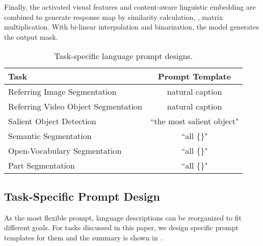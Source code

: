 \documentclass[10pt,twocolumn,letterpaper]{article}
\begin{document}
Finally, the activated visual features and content-aware linguistic embedding are combined to generate response map by similarity calculation, \ie, matrix multiplication. With bi-linear interpolation and binarization, the model generates the output mask.










\begin{table}
    \centering
    \small
    \renewcommand\arraystretch{1.1}
    \vspace{-8pt}
    \caption{Task-specific language prompt designs.}
    \setlength\tabcolsep{3.0pt}
    \label{tab:prompt}
    \begin{tabular}{l|c}
    \toprule
    Task  &Prompt Template  \\
    \hline
       Referring Image Segmentation & natural caption \\
       Referring Video Object Segmentation & natural caption \\
       Salient Object Detection & ``the most salient object" \\
       Semantic Segmentation & ``all  \{\}" \\
       Open-Vocabulary Segmentation & ``all  \{\}" \\
       Part Segmentation & ``all \{\}" \\
\bottomrule
       
    \end{tabular}
    \vspace{-15pt}
\end{table} \subsection{Task-Specific Prompt Design}
As the most flexible prompt, language descriptions can be reorganized to fit different goals. For tasks discussed in this paper, we design specific prompt templates for them and the summary is shown in . 
\end{document}
